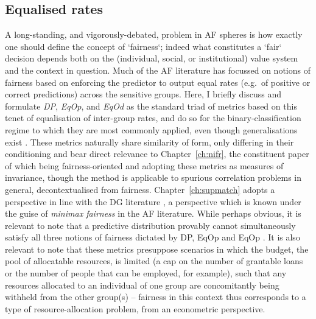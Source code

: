 \subsection{Equalised rates}\label{sec:equalised-rates}
%
A long-standing, and vigorously-debated, problem in \ac{AF} spheres is how exactly one should
define the concept of `fairness`; indeed what constitutes a `fair` decision depends both on the
(individual, social, or institutional) value system and the context in question.
%
Much of the \ac{AF} literature has focussed on notions of fairness based on enforcing the predictor
to output equal rates (e.g.\ of positive or correct predictions) across the sensitive groups.
%
Here, I briefly discuss and formulate \emph{\ac{DP}}, \emph{\ac{EqOp}}, and \emph{\ac{EqOd}} as
the standard triad of metrics based on this tenet of equalisation of inter-group rates, and do so
for the binary-classification regime to which they are most commonly applied, even though
generalisations exist \citep{woodworth2017learning}. 
%
These metrics naturally share similarity of form, only differing in their conditioning and bear
direct relevance to Chapter~\ref{ch:nifr}, the constituent paper of which being fairness-oriented
and adopting these metrics as measures of invariance, though the method is applicable to spurious
correlation problems in general, decontextualised from fairness.
%
Chapter~\ref{ch:supmatch} adopts a perspective in line with the \ac{DG} literature
\citep{sagawa2019distributionally}, a perspective which is known under the guise of \emph{minimax
fairness} in the \ac{AF} literature.
%
While perhaps obvious, it is relevant to note that a predictive distribution provably cannot
simultaneously satisfy all three notions of fairness dictated by \ac{DP}, \ac{EqOp} and \ac{EqOp}
\citep{kleinberg2016inherent}.
%
It is also relevant to note that these metrics presuppose scenarios in which the budget, the pool
of allocatable resources, is limited (a cap on the number of grantable loans or the number of
people that can be employed, for example), such that any resources allocated to an individual of
one group are concomitantly being withheld from the other group(s) -- fairness in this context thus
corresponds to a type of resource-allocation problem, from an econometric perspective.
%

